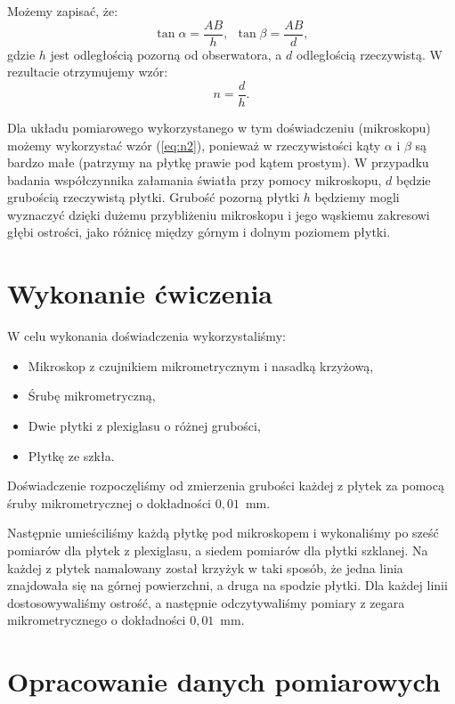 \documentclass[12pt,a4paper]{article}
\numberwithin{equation}{section}
\begin{document}
Możemy zapisać, że:
\begin{equation}
	\tan \alpha = \frac{AB}{h},~~\tan \beta = \frac{AB}{d},
\end{equation}
gdzie $h$ jest odległością pozorną od obserwatora, a $d$ odległością rzeczywistą. W rezultacie otrzymujemy wzór:
\begin{equation}
	n = \frac{d}{h}.
	\label{eq:n2}
\end{equation}

Dla układu pomiarowego wykorzystanego w tym doświadczeniu (mikroskopu) możemy wykorzystać wzór (\ref{eq:n2}), ponieważ w rzeczywistości kąty $\alpha$ i $\beta$ są bardzo małe (patrzymy na płytkę prawie pod kątem prostym). W przypadku badania współczynnika załamania światła przy pomocy mikroskopu, $d$ będzie grubością rzeczywistą płytki. Grubość pozorną płytki $h$ będziemy mogli wyznaczyć dzięki dużemu przybliżeniu mikroskopu i jego wąskiemu zakresowi głębi ostrości, jako różnicę między górnym i dolnym poziomem płytki.

\section{Wykonanie ćwiczenia}
\label{sec:2}

W celu wykonania doświadczenia wykorzystaliśmy:
\begin{itemize}
	\item Mikroskop z czujnikiem mikrometrycznym i nasadką krzyżową,
	\item Śrubę mikrometryczną,
	\item Dwie płytki z plexiglasu o różnej grubości,
	\item Płytkę ze szkła.
\end{itemize}

Doświadczenie rozpoczęliśmy od zmierzenia grubości każdej z płytek za pomocą śruby mikrometrycznej o dokładności $0,01$~mm.

Następnie umieściliśmy każdą płytkę pod mikroskopem i wykonaliśmy po sześć pomiarów dla płytek z plexiglasu, a siedem pomiarów dla płytki szklanej. Na każdej z płytek namalowany został krzyżyk w taki sposób, że jedna linia znajdowała się na górnej powierzchni, a druga na spodzie płytki. Dla każdej linii dostosowywaliśmy ostrość, a następnie odczytywaliśmy pomiary z zegara mikrometrycznego o dokładności $0,01$~mm.

\pagebreak
\section{Opracowanie danych pomiarowych}
\end{document}
